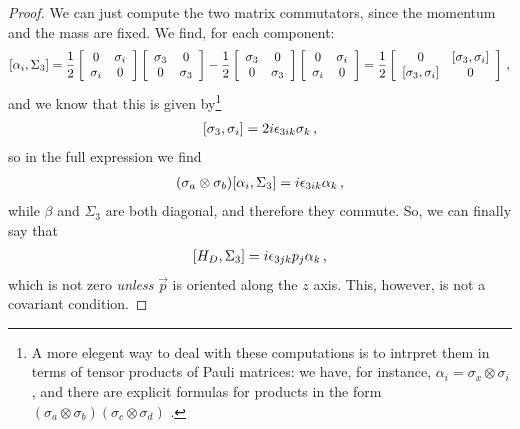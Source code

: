 \documentclass[main.tex]{subfiles}
\begin{document}
\begin{proof}
We can just compute the two matrix commutators, since the momentum and the mass are fixed. We find, for each component:
%
\begin{subequations}
\begin{align}
\qty[\alpha_{i}, \Sigma_{3}] = 
\frac{1}{2}
\left[\begin{array}{cc}
0 & \sigma_{i} \\ 
\sigma_{i} & 0
\end{array}\right]
\left[\begin{array}{cc}
\sigma_3  & 0 \\ 
0 & \sigma_3 
\end{array}\right] 
- \frac{1}{2} 
\left[\begin{array}{cc}
\sigma_3  & 0 \\ 
0 & \sigma_3 
\end{array}\right]
\left[\begin{array}{cc}
0 & \sigma_{i} \\ 
\sigma_{i} & 0
\end{array}\right]
=  \frac{1}{2}
\left[\begin{array}{cc}
0 & \qty[\sigma_3, \sigma_{i}] \\ 
\qty[\sigma_3, \sigma_{i}] & 0
\end{array}\right]
\,,
\end{align}
\end{subequations}
%
and we know that this is given by\footnote{A more elegent way to deal with these computations is to intrpret them in terms of tensor products of Pauli matrices: we have, for instance, \(\alpha_{i} = \sigma_{x} \otimes \sigma_{i}\), and there are explicit formulas for products in the form \((\sigma_{a } \otimes \sigma_{b})(\sigma_{c } \otimes \sigma_{d}) \) \cite[]{agartthaCommutatorsTensorProduct2018}.}
%
\begin{align}
\qty[\sigma_{3}, \sigma_{i}] = 2i \epsilon_{3ik} \sigma_{k} 
\,,
\end{align}
%
so in the full expression we find 
%
\begin{align}(\sigma_{a } \otimes \sigma_{b})
\qty[\alpha_{i}, \Sigma_3]
=
i \epsilon_{3ik} \alpha_{k}
\,,
\end{align}
%
while \(\beta \) and \(\Sigma_3 \) are both diagonal, and therefore they commute. So, we can finally say that 
%
\begin{align} \label{eq:spin-conservation-dirac}
\qty[H_D, \Sigma_3 ] = i \epsilon_{3jk} p_{j} \alpha_{k} 
\,,
\end{align}
%
which is not zero \emph{unless} \(\vec{p}\) is oriented along the \(z\) axis.
This, however, is not a covariant condition. 
\end{proof}
\end{document}
